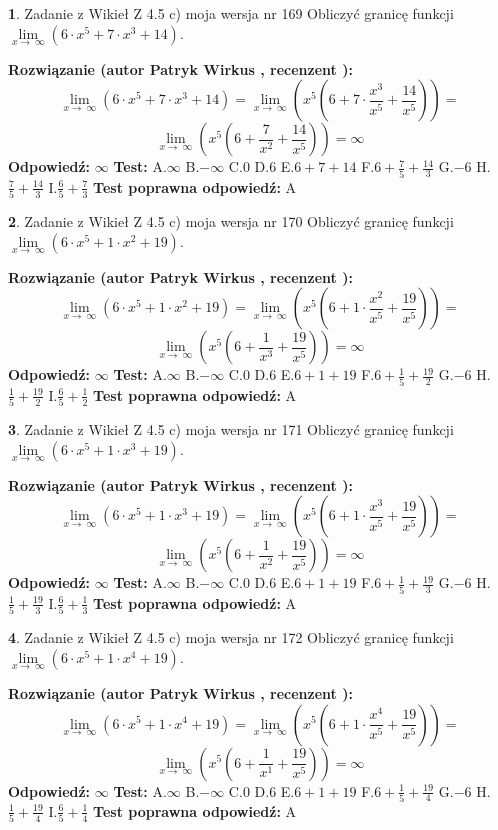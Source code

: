 \documentclass[12pt, a4paper]{article}
\theoremstyle{definition} %
\newtheorem{zad}{}
\newcommand{\zadStart}[1]{\begin{zad}#1\newline}
\newcommand{\zadStop}{\end{zad}}
\newcommand{\rozwStart}[2]{\noindent \textbf{Rozwiązanie (autor #1 , recenzent #2): }\newline}
\newcommand{\rozwStop}{\newline}
\newcommand{\odpStart}{\noindent \textbf{Odpowiedź:}\newline}
\newcommand{\odpStop}{\newline}
\newcommand{\testStart}{\noindent \textbf{Test:}\newline}
\newcommand{\testStop}{\newline}
\newcommand{\kluczStart}{\noindent \textbf{Test poprawna odpowiedź:}\newline}
\newcommand{\kluczStop}{\newline}
\begin{document}
\zadStart{Zadanie z Wikieł Z 4.5 c) moja wersja nr 169}
Obliczyć granicę funkcji  $\lim\limits_{x\to\ \infty}(6 \cdot x^{5}+7 \cdot x^{3}+14)$.
\zadStop
\rozwStart{Patryk Wirkus}{}
$$\lim\limits_{x\to\ \infty}(6 \cdot x^{5}+7 \cdot x^{3}+14) = \lim\limits_{x\to\ \infty}(x^{5}(6 +7 \cdot \frac{x^{3}}{x^{5}}+\frac{14}{x^{5}})) =$$ $$\lim\limits_{x\to\ \infty}(x^{5}(6 +\frac{7}{x^{2}}+\frac{14}{x^{5}})) =\infty$$
\rozwStop
\odpStart
$\infty$
\odpStop
\testStart
A.$\infty$ B.$-\infty$ C.$0$ D.$6$ E.$6 + 7 + 14$
F.$6+\frac{7}{5}+\frac{14}{3}$ G.$-6$
H.$\frac{7}{5}+\frac{14}{3}$
I.$\frac{6}{5}+\frac{7}{3}$
\testStop
\kluczStart
A
\kluczStop



\zadStart{Zadanie z Wikieł Z 4.5 c) moja wersja nr 170}
Obliczyć granicę funkcji  $\lim\limits_{x\to\ \infty}(6 \cdot x^{5}+1 \cdot x^{2}+19)$.
\zadStop
\rozwStart{Patryk Wirkus}{}
$$\lim\limits_{x\to\ \infty}(6 \cdot x^{5}+1 \cdot x^{2}+19) = \lim\limits_{x\to\ \infty}(x^{5}(6 +1 \cdot \frac{x^{2}}{x^{5}}+\frac{19}{x^{5}})) =$$ $$\lim\limits_{x\to\ \infty}(x^{5}(6 +\frac{1}{x^{3}}+\frac{19}{x^{5}})) =\infty$$
\rozwStop
\odpStart
$\infty$
\odpStop
\testStart
A.$\infty$ B.$-\infty$ C.$0$ D.$6$ E.$6 + 1 + 19$
F.$6+\frac{1}{5}+\frac{19}{2}$ G.$-6$
H.$\frac{1}{5}+\frac{19}{2}$
I.$\frac{6}{5}+\frac{1}{2}$
\testStop
\kluczStart
A
\kluczStop



\zadStart{Zadanie z Wikieł Z 4.5 c) moja wersja nr 171}
Obliczyć granicę funkcji  $\lim\limits_{x\to\ \infty}(6 \cdot x^{5}+1 \cdot x^{3}+19)$.
\zadStop
\rozwStart{Patryk Wirkus}{}
$$\lim\limits_{x\to\ \infty}(6 \cdot x^{5}+1 \cdot x^{3}+19) = \lim\limits_{x\to\ \infty}(x^{5}(6 +1 \cdot \frac{x^{3}}{x^{5}}+\frac{19}{x^{5}})) =$$ $$\lim\limits_{x\to\ \infty}(x^{5}(6 +\frac{1}{x^{2}}+\frac{19}{x^{5}})) =\infty$$
\rozwStop
\odpStart
$\infty$
\odpStop
\testStart
A.$\infty$ B.$-\infty$ C.$0$ D.$6$ E.$6 + 1 + 19$
F.$6+\frac{1}{5}+\frac{19}{3}$ G.$-6$
H.$\frac{1}{5}+\frac{19}{3}$
I.$\frac{6}{5}+\frac{1}{3}$
\testStop
\kluczStart
A
\kluczStop



\zadStart{Zadanie z Wikieł Z 4.5 c) moja wersja nr 172}
Obliczyć granicę funkcji  $\lim\limits_{x\to\ \infty}(6 \cdot x^{5}+1 \cdot x^{4}+19)$.
\zadStop
\rozwStart{Patryk Wirkus}{}
$$\lim\limits_{x\to\ \infty}(6 \cdot x^{5}+1 \cdot x^{4}+19) = \lim\limits_{x\to\ \infty}(x^{5}(6 +1 \cdot \frac{x^{4}}{x^{5}}+\frac{19}{x^{5}})) =$$ $$\lim\limits_{x\to\ \infty}(x^{5}(6 +\frac{1}{x^{1}}+\frac{19}{x^{5}})) =\infty$$
\rozwStop
\odpStart
$\infty$
\odpStop
\testStart
A.$\infty$ B.$-\infty$ C.$0$ D.$6$ E.$6 + 1 + 19$
F.$6+\frac{1}{5}+\frac{19}{4}$ G.$-6$
H.$\frac{1}{5}+\frac{19}{4}$
I.$\frac{6}{5}+\frac{1}{4}$
\testStop
\kluczStart
A
\kluczStop
\end{document}
